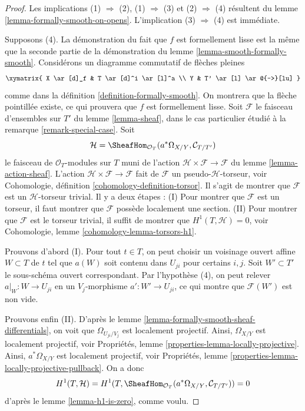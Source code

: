 \begin{proof}
Les implications (1) $\Rightarrow$ (2),
(1) $\Rightarrow$ (3) et (2) $\Rightarrow$ (4) résultent du
lemme \ref{lemma-formally-smooth-on-opens}.
L'implication (3) $\Rightarrow$ (4) est immédiate.

\medskip\noindent
Supposons (4). La démonstration du fait que $f$ est formellement lisse est la même
que la seconde partie de la démonstration du lemme \ref{lemma-smooth-formally-smooth}.
Considérons un diagramme commutatif de flèches pleines
$$
\xymatrix{
X \ar[d]_f & T \ar[d]^i \ar[l]^a \\
Y & T' \ar[l] \ar@{-->}[lu]
}
$$
comme dans la définition \ref{definition-formally-smooth}.
On montrera que la flèche pointillée existe, ce qui
prouvera que $f$ est formellement lisse.
Soit $\mathcal{F}$ le faisceau d'ensembles sur $T'$ du
lemme \ref{lemma-sheaf}, dans le cas particulier étudié à
la remarque \ref{remark-special-case}.
Soit
$$
\mathcal{H} =
\SheafHom_{\mathcal{O}_T}(a^*\Omega_{X/Y}, \mathcal{C}_{T/T'})
$$
le faisceau de $\mathcal{O}_T$-modules sur $T$
muni de l'action $\mathcal{H} \times \mathcal{F} \to \mathcal{F}$ du
lemme \ref{lemma-action-sheaf}.
L'action $\mathcal{H} \times \mathcal{F} \to \mathcal{F}$
fait de $\mathcal{F}$ un pseudo-$\mathcal{H}$-torseur, voir
Cohomologie, définition \ref{cohomology-definition-torsor}.
Il s'agit de montrer que $\mathcal{F}$ est un $\mathcal{H}$-torseur trivial.
Il y a deux étapes : (I) Pour montrer que $\mathcal{F}$ est un torseur,
il faut montrer que $\mathcal{F}$ possède localement une
section. (II) Pour montrer que $\mathcal{F}$ est le torseur trivial,
il suffit de montrer que $H^1(T, \mathcal{H}) = 0$, voir
Cohomologie, lemme \ref{cohomology-lemma-torsors-h1}.

\medskip\noindent
Prouvons d'abord (I). Pour tout $t \in T$, on peut
choisir un voisinage ouvert affine $W \subset T$ de $t$
tel que $a(W)$ soit contenu dans $U_{ji}$ pour certains $i, j$.
Soit $W' \subset T'$ le sous-schéma ouvert correspondant.
Par l'hypothèse (4), on peut relever $a|_W : W \to U_{ji}$
en un $V_j$-morphisme $a' : W' \to U_{ji}$, ce qui montre que
$\mathcal{F}(W')$ est non vide.

\medskip\noindent
Prouvons enfin (II). D'après
le lemme \ref{lemma-formally-smooth-sheaf-differentials},
on voit que $\Omega_{U_{ji}/V_j}$ est localement projectif.
Ainsi, $\Omega_{X/Y}$ est localement projectif, voir
Propriétés, lemme \ref{properties-lemma-locally-projective}.
Ainsi, $a^*\Omega_{X/Y}$ est localement projectif, voir
Propriétés, lemme \ref{properties-lemma-locally-projective-pullback}.
On a donc
$$
H^1(T, \mathcal{H}) =
H^1(T, \SheafHom_{\mathcal{O}_T}(a^*\Omega_{X/Y}, \mathcal{C}_{T/T'})) = 0
$$
d'après
le lemme \ref{lemma-h1-is-zero},
comme voulu.
\end{proof}

